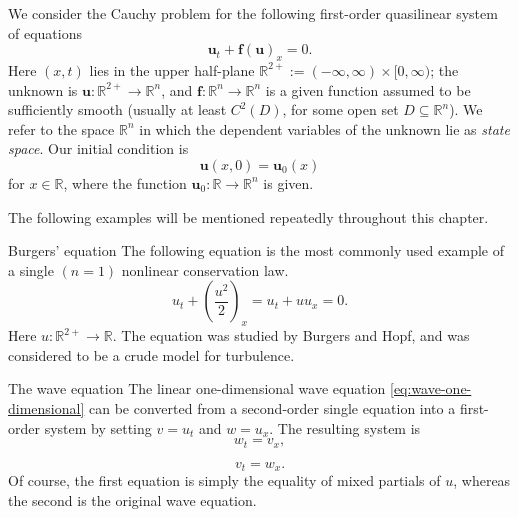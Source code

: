 We consider the Cauchy problem for the following first-order quasilinear system of equations
\begin{equation}\label{eq:conservation-law-system}
\bm{u}_t+\bm{f}(\bm{u})_x=0.
\end{equation}
Here $(x,t)$ lies in the upper half-plane $\mathbb{R}^{2+}:=(-\infty,\infty)\times[0,\infty)$; the unknown is $\bm{u}:\mathbb{R}^{2+}\to\mathbb{R}^n$, and $\bm{f}:\mathbb{R}^n\to\mathbb{R}^n$ is a given function assumed to be sufficiently smooth (usually at least $C^2(D)$, for some open set $D\subseteq\mathbb{R}^n$). We refer to the space $\mathbb{R}^n$ in which the dependent variables of the unknown lie as \emph{state space}. Our initial condition is
\begin{equation}\label{eq:conservation-law-cauchy-data}
\bm{u}(x,0)=\bm{u}_0(x)
\end{equation}
for $x\in\mathbb{R}$, where the function $\bm{u}_0:\mathbb{R}\to\mathbb{R}^n$ is given.

The following examples will be mentioned repeatedly throughout this chapter.

\begin{Example}{Burgers' equation}
\label{ex:burgers-equation}
The following equation is the most commonly used example of a single $(n=1)$ nonlinear conservation law.
\begin{equation}\label{eq:burgers-conservation-law}
u_t+\left(\dfrac{u^2}{2}\right)_x=u_t+uu_x=0.
\end{equation}
Here $u:\mathbb{R}^{2+}\to\mathbb{R}$. The equation was studied by Burgers and Hopf, and was considered to be a crude model for turbulence.
\end{Example}

\begin{Example}{The wave equation}
\label{ex:wave-first-order-system}
The linear one-dimensional wave equation \eqref{eq:wave-one-dimensional} can be converted from a second-order single equation into a first-order system by setting $v=u_t$ and $w=u_x$. The resulting system is
\begin{equation}\label{eq:wave-first-order-w}
w_t=v_x,
\end{equation}

\begin{equation}\label{eq:wave-first-order-v}
v_t=w_x.
\end{equation}
Of course, the first equation is simply the equality of mixed partials of $u$, whereas the second is the original wave equation.
\end{Example}

